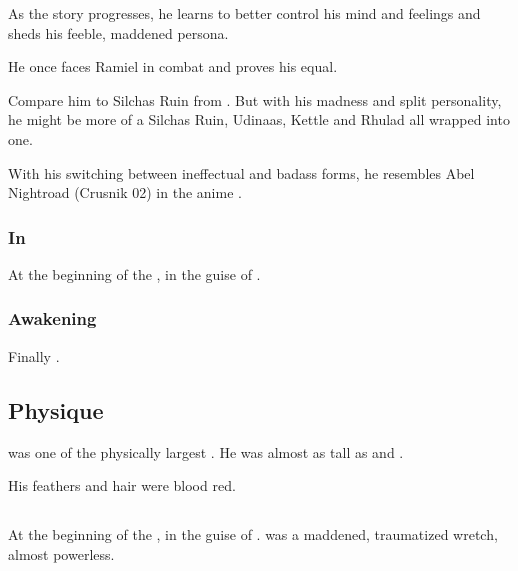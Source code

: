 As the story progresses, he learns to better control his mind and feelings and sheds his feeble, maddened persona.

He once faces Ramiel in combat and proves his equal.

Compare him to Silchas Ruin from \cite{StevenEriksonIanCameronEsslemont:MalazanBookoftheFallen}. 
But with his madness and split personality, he might be more of a Silchas Ruin, Udinaas, Kettle and Rhulad all wrapped into one.

With his switching between ineffectual and badass forms, he resembles Abel Nightroad (Crusnik 02) in the anime \cite{Anime:TrinityBlood}.





\subsubsection{In \Redce}
At the beginning of the \thirdbanewar, \Sithiyacaan {} in the guise of . 





\subsubsection{Awakening}
Finally . 









\subsection{Physique}
\Sithiyacaan{} was one of the physically largest \satharioth. 
He was almost as tall as \Harbeth{} and \Zachirah. 

His feathers and hair were blood red.









\subsection{\MoriceHerette}
At the beginning of the \thirdbanewar, \Sithiyacaan {} in the guise of {\MoriceHerette}. 
\Sithiyacaan was a maddened, traumatized wretch, almost powerless. 

